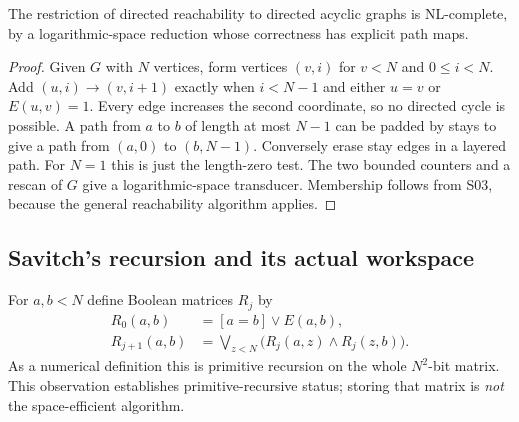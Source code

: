 \begin{corollary}
\label{thm:S04}
The restriction of directed reachability to directed acyclic graphs is
NL-complete, by a logarithmic-space reduction whose correctness has
explicit path maps.
\end{corollary}
\begin{proof}
Given $G$ with $N$ vertices, form vertices $(v,i)$ for $v<N$ and
$0\leq i<N$.  Add $(u,i)\to(v,i+1)$ exactly when $i<N-1$ and either
$u=v$ or $E(u,v)=1$.  Every edge increases the second coordinate, so
no directed cycle is possible.  A path from $a$ to $b$ of length at
most $N-1$ can be padded by stays to give a path from $(a,0)$ to
$(b,N-1)$.  Conversely erase stay edges in a layered path.  For $N=1$
this is just the length-zero test.  The two bounded counters and a
rescan of $G$ give a logarithmic-space transducer.  Membership follows
from S03, because the general reachability algorithm applies.
\end{proof}

\subsection{Savitch's recursion and its actual workspace}

For $a,b<N$ define Boolean matrices $R_j$ by
\[
 \begin{split}
 R_0(a,b)&=[a=b]\vee E(a,b),\\
 R_{j+1}(a,b)&=\bigvee_{z<N}
                 \bigl(R_j(a,z)\wedge R_j(z,b)\bigr).
 \end{split}                                             \tag{S.4}
\]
As a numerical definition this is primitive recursion on the whole
$N^2$-bit matrix.  This observation establishes primitive-recursive
status; storing that matrix is \emph{not} the space-efficient algorithm.

